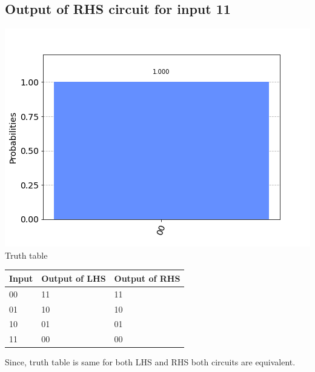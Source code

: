 \documentclass[a4paper]{article}
\begin{document}
\begin{answer}[Question 1 b (a)]
        \subsection*{Output of RHS circuit for input 11}
        \includegraphics[scale = 0.5]{a211-out.png}\\
        Truth table        
        \begin{center}
            \begin{tabular}{ | m{3cm}| m{3cm} |m{3cm}| } 
                \hline
                Input	&	Output of LHS & Output of RHS \\
                \hline
                00 & 11&11\\
                01 & 10&10\\
                10 & 01&01\\
                11 & 00&00\\
                \hline
            \end{tabular}
        \end{center} 
        Since, truth table is same for both LHS and RHS both circuits are equivalent. 
    \end{answer}
\end{document}
